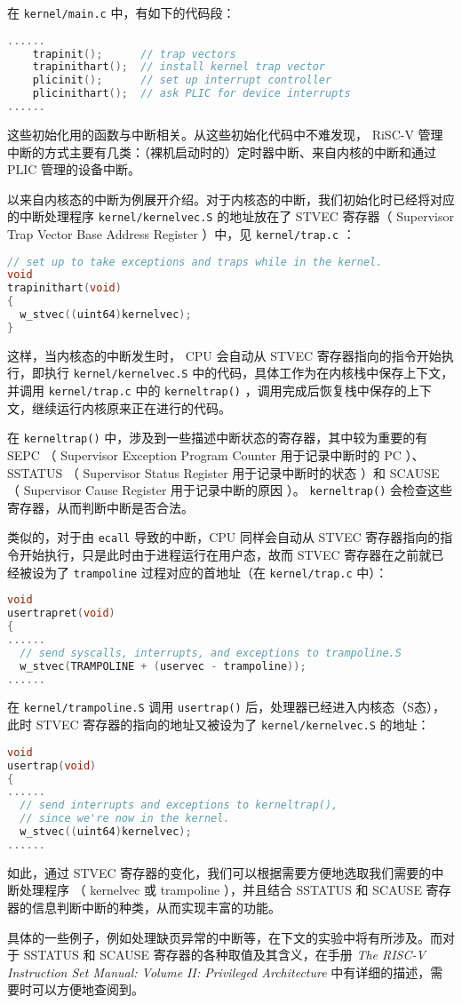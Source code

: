 在 \lstinline{kernel/main.c} 中，有如下的代码段：
\begin{lstlisting}[language=C]
......
    trapinit();      // trap vectors
    trapinithart();  // install kernel trap vector
    plicinit();      // set up interrupt controller
    plicinithart();  // ask PLIC for device interrupts
......
\end{lstlisting}


这些初始化用的函数与中断相关。从这些初始化代码中不难发现， RiSC-V 管理中断的方式主要有几类：（裸机启动时的）定时器中断、来自内核的中断和通过 PLIC 管理的设备中断。

以来自内核态的中断为例展开介绍。对于内核态的中断，我们初始化时已经将对应的中断处理程序 \lstinline{kernel/kernelvec.S} 的地址放在了 STVEC 寄存器（ Supervisor Trap Vector Base Address Register ）中，见 \lstinline{kernel/trap.c} ：
\begin{lstlisting}[language=C]
// set up to take exceptions and traps while in the kernel.
void
trapinithart(void)
{
  w_stvec((uint64)kernelvec);
}
\end{lstlisting}

这样，当内核态的中断发生时， CPU 会自动从 STVEC 寄存器指向的指令开始执行，即执行 \lstinline{kernel/kernelvec.S} 中的代码，具体工作为在内核栈中保存上下文，并调用 \lstinline{kernel/trap.c} 中的 \lstinline{kerneltrap()} ，调用完成后恢复栈中保存的上下文，继续运行内核原来正在进行的代码。

在 \lstinline{kerneltrap()} 中，涉及到一些描述中断状态的寄存器，其中较为重要的有 SEPC （  Supervisor Exception Program Counter 用于记录中断时的 PC ）、 SSTATUS （ Supervisor Status Register 用于记录中断时的状态 ）和 SCAUSE （ Supervisor Cause Register 用于记录中断的原因 ）。 \lstinline{kerneltrap()} 会检查这些寄存器，从而判断中断是否合法。

类似的，对于由 \lstinline{ecall} 导致的中断，CPU 同样会自动从 STVEC 寄存器指向的指令开始执行，只是此时由于进程运行在用户态，故而 STVEC 寄存器在之前就已经被设为了 \lstinline{trampoline} 过程对应的首地址（在 \lstinline{kernel/trap.c} 中）：
\begin{lstlisting}[language=C]
void
usertrapret(void)
{
......
  // send syscalls, interrupts, and exceptions to trampoline.S
  w_stvec(TRAMPOLINE + (uservec - trampoline));
......
\end{lstlisting}

在 \lstinline{kernel/trampoline.S} 调用 \lstinline{usertrap()} 后，处理器已经进入内核态（S态），此时 STVEC 寄存器的指向的地址又被设为了 \lstinline{kernel/kernelvec.S} 的地址：
\begin{lstlisting}[language=C]
void
usertrap(void)
{
......
  // send interrupts and exceptions to kerneltrap(),
  // since we're now in the kernel.
  w_stvec((uint64)kernelvec);
......
\end{lstlisting}

如此，通过 STVEC 寄存器的变化，我们可以根据需要方便地选取我们需要的中断处理程序 （ kernelvec 或 trampoline ），并且结合 SSTATUS 和 SCAUSE 寄存器的信息判断中断的种类，从而实现丰富的功能。

具体的一些例子，例如处理缺页异常的中断等，在下文的实验中将有所涉及。而对于 SSTATUS 和 SCAUSE 寄存器的各种取值及其含义，在手册 \textit{The RISC-V Instruction Set Manual: Volume II: Privileged Architecture} 中有详细的描述，需要时可以方便地查阅到。
